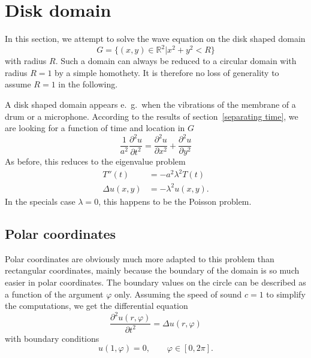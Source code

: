 %
%
%
\section{Disk domain}
In this section, we attempt to solve the wave equation on the
disk shaped domain
\[
G=\{(x,y)\in\mathbb R^2|x^2+y^2 < R\}
\]
with radius $R$.
Such a domain can always be reduced to a circular domain with radius
$R=1$ by a simple homothety.
It is therefore no loss of generality to assume $R=1$ in the following.

A disk shaped domain appears e.~g.~when the vibrations of the membrane of
a drum or a microphone.
According to the results of section~\ref{separating time}, we are looking
for a function of time and location in $G$
\[
\frac1{a^2}\frac{\partial^2 u}{\partial t^2}
=
\frac{\partial^2 u}{\partial x^2}+\frac{\partial^2 u}{\partial y^2}
\]
As before, this reduces to the eigenvalue problem
\begin{align*}
T''(t)&=-a^2\lambda^2 T(t)\\
\Delta u(x,y)&=-\lambda^2u(x,y).
\end{align*}
In the specials case $\lambda=0$, this happens to be the Poisson problem.

\subsection{Polar coordinates}
Polar coordinates are obviously much more adapted to this problem than
rectangular coordinates, mainly because the boundary of the domain
is so much easier in polar coordinates.
The boundary values on the circle can be described as a function
of the argument $\varphi$ only.
Assuming the speed of sound $c=1$ to simplify the computations, we
get the differential equation
\[
\frac{\partial^2u(r,\varphi)}{\partial t^2}=\Delta u(r,\varphi)
\]
with boundary conditions
\[
u(1,\varphi)=0,\qquad\varphi\in[0,2\pi].
\]

